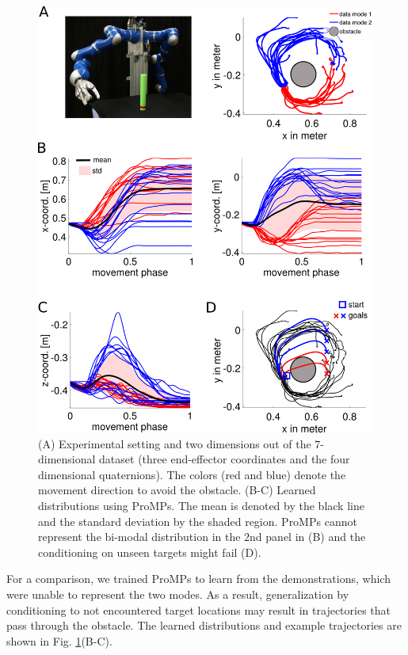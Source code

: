 \begin{figure}
\begin{center}
\includegraphics[width=0.48\columnwidth]{elmarICRA/pics/BiModal_Data_ProMPs.png}
\end{center}
\caption{(A) Experimental setting and two dimensions out of the $7$-dimensional dataset (three end-effector coordinates and the four dimensional quaternions). The colors (red and blue) denote the movement direction to avoid the obstacle.
(B-C) Learned distributions using ProMPs. The mean is denoted by the black line and the standard deviation by the shaded region. 
ProMPs cannot represent the bi-modal distribution in the $2$nd panel in (B) and 
the conditioning on unseen targets might fail (D). 
\label{fig:bimodal_data_promps}}
\end{figure}

For a comparison, we trained ProMPs to learn from the demonstrations, 
which were unable to represent the two modes. 
As a result, generalization by
conditioning to not encountered target locations may result in trajectories that pass
through the obstacle. The learned distributions and example trajectories are shown in Fig. \ref{fig:bimodal_data_promps}(B-C).

  
